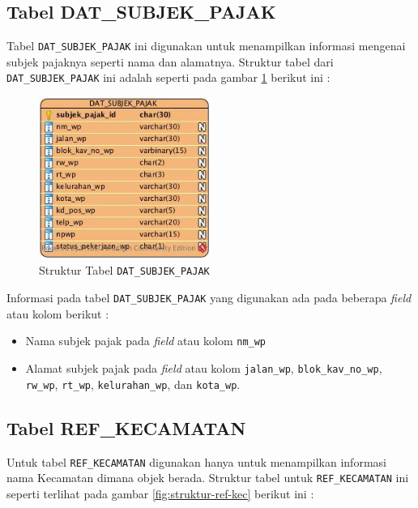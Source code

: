 \subsection{Tabel DAT\_SUBJEK\_PAJAK}

Tabel \texttt{DAT\_SUBJEK\_PAJAK} ini digunakan untuk menampilkan informasi mengenai subjek pajaknya seperti nama dan alamatnya. Struktur tabel dari \texttt{DAT\_SUBJEK\_PAJAK} ini adalah seperti pada gambar \ref{fig:struktur-dat-sp} berikut ini :

\begin{figure}[H]
	\centering
	\includegraphics[width=0.5\textwidth]{./resources/struktur-tabel-dat-sp}
	\caption{Struktur Tabel \texttt{DAT\_SUBJEK\_PAJAK}}
	\label{fig:struktur-dat-sp}
\end{figure}

Informasi pada tabel \texttt{DAT\_SUBJEK\_PAJAK} yang digunakan ada pada beberapa \textit{field} atau kolom berikut :

\begin{itemize}
	\item Nama subjek pajak pada \textit{field} atau kolom \texttt{nm\_wp}
	\item Alamat subjek pajak pada \textit{field} atau kolom \texttt{jalan\_wp}, \texttt{blok\_kav\_no\_wp}, \texttt{rw\_wp}, \texttt{rt\_wp}, \texttt{kelurahan\_wp}, dan \texttt{kota\_wp}.
\end{itemize}

\subsection{Tabel REF\_KECAMATAN}

Untuk tabel \texttt{REF\_KECAMATAN} digunakan hanya untuk menampilkan informasi nama Kecamatan dimana objek berada. Struktur tabel untuk \texttt{REF\_KECAMATAN} ini seperti terlihat pada gambar \ref{fig:struktur-ref-kec} berikut ini :

